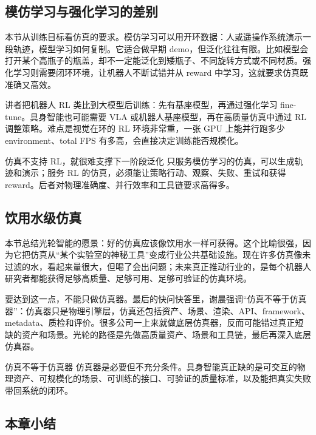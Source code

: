 \documentclass[a4paper]{article}
\begin{document}
\subsection{模仿学习与强化学习的差别}

本节从训练目标看仿真的要求。模仿学习可以用开环数据：人或遥操作系统演示一段轨迹，模型学习如何复制。它适合做早期 demo，但泛化往往有限。比如模型会打开某个高瓶子的瓶盖，却不一定能泛化到矮瓶子、不同旋转方式或不同材质。强化学习则需要闭环环境，让机器人不断试错并从 reward 中学习，这就要求仿真既准确又高效。

讲者把机器人 RL 类比到大模型后训练：先有基座模型，再通过强化学习 fine-tune。具身智能也可能需要 VLA 或机器人基座模型，再在高质量仿真中通过 RL 调整策略。难点是视觉在环的 RL 环境非常重，一张 GPU 上能并行跑多少 environment、total FPS 有多高，会直接决定训练能否规模化。

\begin{warningbox}{仿真不支持 RL，就很难支撑下一阶段泛化}
只服务模仿学习的仿真，可以生成轨迹和演示；服务 RL 的仿真，必须能让策略行动、观察、失败、重试和获得 reward。后者对物理准确度、并行效率和工具链要求高得多。
\end{warningbox}

\subsection{饮用水级仿真}

本节总结光轮智能的愿景：好的仿真应该像饮用水一样可获得。这个比喻很强，因为它把仿真从“某个实验室的神秘工具”变成行业公共基础设施。现在许多仿真像未过滤的水，看起来量很大，但喝了会出问题；未来真正推动行业的，是每个机器人研究者都能获得足够高质量、足够可用、足够可验证的仿真环境。

要达到这一点，不能只做仿真器。最后的快问快答里，谢晨强调“仿真不等于仿真器”：仿真器只是物理引擎层，仿真还包括资产、场景、渲染、API、framework、metadata、质检和评价。很多公司一上来就做底层仿真器，反而可能错过真正短缺的资产和场景。光轮的路径是先做高质量资产、场景和工具链，最后再深入底层仿真器。

\begin{importantbox}{仿真不等于仿真器}
仿真器是必要但不充分条件。具身智能真正缺的是可交互的物理资产、可规模化的场景、可训练的接口、可验证的质量标准，以及能把真实失败带回系统的闭环。
\end{importantbox}

\subsection{本章小结}
\end{document}
